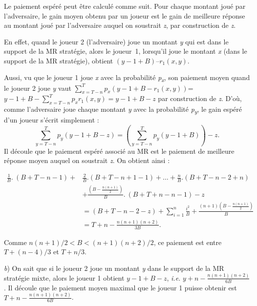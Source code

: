 \begin{Article}
\begin{refsection}[UmbhauerFR]
\begin{appendices}
Le paiement espéré peut être calculé comme suit. Pour chaque montant
joué par l'adversaire, le gain moyen obtenu par un joueur est le gain de
meilleure réponse au montant joué par l'adversaire auquel on soustrait
\emph{z}, par construction de \emph{z}.

En effet, quand le joueur 2 (l'adversaire) joue un montant \emph{y} qui
est dans le support de la MR stratégie, alors le joueur~1, lorsqu'il
joue le montant \emph{x} (dans le support de la MR stratégie), obtient
$(y - 1 + B) – r_{1}(x, y)$.

Aussi, vu que le joueur 1 joue \emph{x} avec la probabilité
\emph{p\textsubscript{x}}, son paiement moyen quand le joueur 2 joue
\emph{y} vaut \(\sum_{x = T - n}^{T}{p_{x}(y - 1 + B - r_{1}(x, y))}\)=
\(y - 1 + B - \sum_{x = T - n}^{T}{p_{x}r_{1}(x, y)} = y - 1 + B - z\)
par construction de \emph{z}. D'où, comme l'adversaire joue chaque
montant \emph{y} avec la probabilité \emph{p\textsubscript{y}}, le gain espéré
d'un joueur s'écrit simplement :
\[
\sum_{y = T - n}^{T}{p_{y}(y - 1 + B - z)} =  \left( \sum_{y = T - n}^{T}{p_{y}(y - 1 + B)} \right) - z.
\]
Il découle que le paiement espéré associé au MR est le paiement de
meilleure réponse moyen auquel on soustrait \emph{z}. On obtient ainsi :

\newpage

\begin{equation*}
\begin{split}
\frac{1}{B}.\ (B + T - n - 1) +& \frac{2}{B}.(B + T - n + 1 - 1) + \ldots + \frac{n}{B}.(B + T - n - 2 + n)\\
&+ \frac{\left( B - \frac{n(n + 1)}{2} \right)}{B}.\ (B + T + n - n - 1) - z\\
&= (B + T - n - 2 - z) + \sum_{i = 1}^{n} \frac{i^{2}}{B} + \frac{(n + 1)\left( B - \frac{n(n + 1)}{2} \right)}{B}\\
&= T + n - \frac{n(n + 1)(n + 2)}{3B}.
\end{split}
\end{equation*}

Comme \(n(n + 1)/2 < B < (n + 1)(n + 2)/2\), ce paiement est entre
\(T + (n - 4)/3\) et \(T + n/3\).

\emph{b}) On sait que si le joueur 2 joue un montant \emph{y} dans le support de
  la MR stratégie mixte, alors le joueur 1 obtient \(y - 1 + B - z\),
  \emph{i.e.} \(y + n - \frac{n(n + 1)(n + 2)}{6B}\). Il découle que le
  paiement moyen maximal que le joueur 1 puisse obtenir est
  \(T + n - \frac{n(n + 1)(n + 2)}{6B}\).


\end{appendices}
\end{refsection}
\end{Article}
